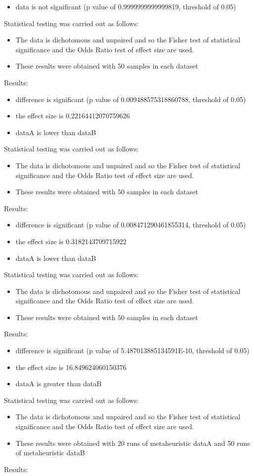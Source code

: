 \documentclass[]{article}
\begin{document}
\begin{itemize}
\item{data is not significant (p value of 0.9999999999999819, threshold of 0.05)}
\end{itemize}Statistical testing was carried out as follows: \begin{itemize}
\item{The data is dichotomous and unpaired and so the Fisher test of statistical significance and the Odds Ratio test of effect size are used.}
\item{These results were obtained with 50 samples in each dataset}
\end{itemize}Results:
\begin{itemize}
\item{difference is significant (p value of 0.009488575318860788, threshold of 0.05)}
\item{the effect size is 0.22164412070759626}
\item{dataA is lower than dataB}
\end{itemize}Statistical testing was carried out as follows: \begin{itemize}
\item{The data is dichotomous and unpaired and so the Fisher test of statistical significance and the Odds Ratio test of effect size are used.}
\item{These results were obtained with 50 samples in each dataset}
\end{itemize}Results:
\begin{itemize}
\item{difference is significant (p value of 0.008471290461855314, threshold of 0.05)}
\item{the effect size is 0.3182143709715922}
\item{dataA is lower than dataB}
\end{itemize}Statistical testing was carried out as follows: \begin{itemize}
\item{The data is dichotomous and unpaired and so the Fisher test of statistical significance and the Odds Ratio test of effect size are used.}
\item{These results were obtained with 50 samples in each dataset}
\end{itemize}Results:
\begin{itemize}
\item{difference is significant (p value of 5.487013885134591E-10, threshold of 0.05)}
\item{the effect size is 16.849624060150376}
\item{dataA is greater than dataB}
\end{itemize}Statistical testing was carried out as follows: \begin{itemize}
\item{The data is dichotomous and unpaired and so the Fisher test of statistical significance and the Odds Ratio test of effect size are used.}
\item{These results were obtained with 20 runs of metaheuristic dataA and 50 runs of metaheuristic dataB}
\end{itemize}Results:
\end{document}

